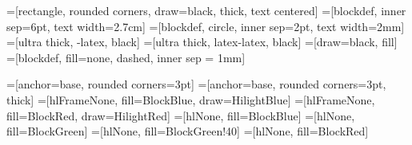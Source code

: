 \usetikzlibrary{topaths}
\usetikzlibrary{decorations.pathmorphing}
\usetikzlibrary{fit}

\newcommand{\RA}{\tikz[baseline=0mm]  \draw[ultra thick, -stealth] (0,1.3mm)--(3.5mm,1.3mm); }

\newcommand{\coordcross}[6]{%
	\draw[->, >=latex] (#1,0) -- (#2,0) node[right,below] {#5};
  \draw[->, >=latex] (0,#3) -- (0,#4) node[left] {#6};
}


=[rectangle, rounded corners, draw=black, thick, text centered]
=[blockdef, inner sep=6pt, text width=2.7cm]
=[blockdef, circle, inner sep=2pt, text width=2mm]
=[ultra thick, -latex, black]
=[ultra thick, latex-latex, black]
=[draw=black, fill]
=[blockdef, fill=none, dashed, inner sep = 1mm]


=[anchor=base, rounded corners=3pt]
=[anchor=base, rounded corners=3pt, thick]
=[hlFrameNone, fill=BlockBlue, draw=HilightBlue]
=[hlFrameNone, fill=BlockRed, draw=HilightRed]
=[hlNone, fill=BlockBlue]
=[hlNone, fill=BlockGreen]
=[hlNone, fill=BlockGreen!40]
=[hlNone, fill=BlockRed]

\everymath{\displaystyle}
\def\hlFrameBlue<#1>#2{\alt<#1>{
  \tikz[baseline]{\node[hlFrameBlue] {#2};}
}{
  \tikz[baseline]{\node[hlFrameNone] {#2};}
}}

\def\hlFrameRed<#1>#2{\alt<#1>{
  \tikz[baseline]{\node[hlFrameRed] {#2};}
}{
  \tikz[baseline]{\node[hlFrameNone] {#2};}
}}

\def\hlBoxBlue<#1>#2{\alt<#1>{
  \tikz[baseline]{\node[hlBlue] {#2};}
}{
  \tikz[baseline]{\node[hlFrameNone] {#2};}
}}


\def\hlBoxGreen<#1>#2{\alt<#1>{
  \tikz[baseline]{\node[hlGreen] {#2};}
}{
  \tikz[baseline]{\node[hlFrameNone] {#2};}
}}

\def\hlBoxLightGreen<#1>#2{\alt<#1>{
  \tikz[baseline]{\node[hlLightGreen] {#2};}
}{
  \tikz[baseline]{\node[hlFrameNone] {#2};}
}}

\def\hlBoxRed<#1>#2{\alt<#1>{
  \tikz[baseline]{\node[hlRed] {#2};}
}{
  \tikz[baseline]{\node[hlFrameNone] {#2};}
}}